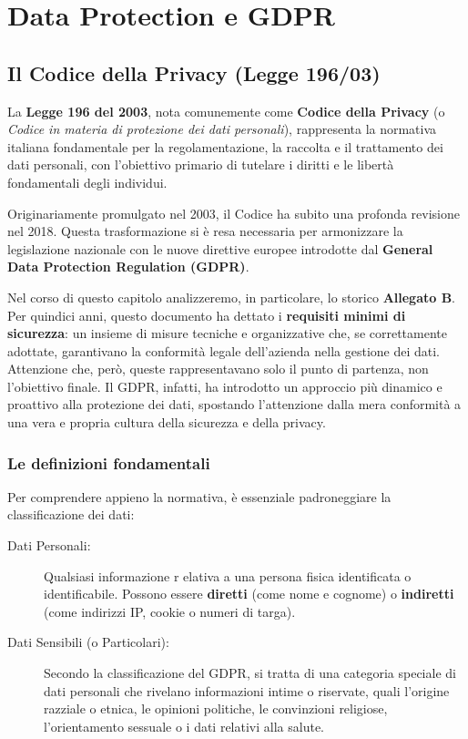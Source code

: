 \chapter{Data Protection e GDPR}

\section{Il Codice della Privacy (Legge 196/03)}

La \textbf{Legge 196 del 2003}, nota comunemente come \textbf{Codice della Privacy} (o \textit{Codice in materia di protezione dei dati personali}), rappresenta la normativa italiana fondamentale per la regolamentazione, la raccolta e il trattamento dei dati personali, con l'obiettivo primario di tutelare i diritti e le libertà fondamentali degli individui.

Originariamente promulgato nel 2003, il Codice ha subito una profonda revisione nel 2018. Questa trasformazione si è resa necessaria per armonizzare la legislazione nazionale con le nuove direttive europee introdotte dal \textbf{General Data Protection Regulation (GDPR)}.

Nel corso di questo capitolo analizzeremo, in particolare, lo storico \textbf{Allegato B}. Per quindici anni, questo documento ha dettato i \textbf{requisiti minimi di sicurezza}: un insieme di misure tecniche e organizzative che, se correttamente adottate, garantivano la conformità legale dell'azienda nella gestione dei dati. Attenzione che, però, queste rappresentavano solo il punto di partenza, non l'obiettivo finale. Il GDPR, infatti, ha introdotto un approccio più dinamico e proattivo alla protezione dei dati, spostando l'attenzione dalla mera conformità a una vera e propria cultura della sicurezza e della privacy.

\subsection*{Le definizioni fondamentali}

Per comprendere appieno la normativa, è essenziale padroneggiare la classificazione dei dati:

\begin{description}
    \item[Dati Personali:] Qualsiasi informazione r elativa a una persona fisica identificata o identificabile. Possono essere \textbf{diretti} (come nome e cognome) o \textbf{indiretti} (come indirizzi IP, cookie o numeri di targa).
    \item[Dati Sensibili (o Particolari):] Secondo la classificazione del GDPR, si tratta di una categoria speciale di dati personali che rivelano informazioni intime o riservate, quali l'origine razziale o etnica, le opinioni politiche, le convinzioni religiose, l'orientamento sessuale o i dati relativi alla salute.
\end{description}

